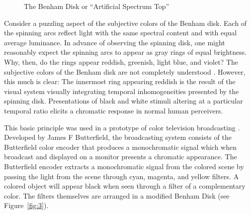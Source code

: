 \begin{figure}[ht]
    \begin{center}
    \end{center}
    \caption{The Benham Disk or ``Artificial Spectrum Top''}
    \label{fig:2}
\end{figure}

Consider a puzzling aspect of the subjective colors of the Benham disk. Each of the spinning arcs reflect light with the same spectral content and with equal average luminance. In advance of observing the spinning disk, one might reasonably expect the spinning arcs to appear as gray rings of equal brightness. Why, then, do the rings appear reddish, greenish, light blue, and violet? The subjective colors of the Benham disk are not completely understood \citep[for a review of some of the color science see][]{Campenhausen:1995yq}. However, this much is clear: The innermost ring appearing reddish is the result of the visual system visually integrating temporal inhomogeneities presented by the spinning disk. Presentations of black and white stimuli altering at a particular temporal ratio elicits a chromatic response in normal human perceivers. 

This basic principle was used in a prototype of color television broadcasting \citep[]{Griffin:1968fk}. Developed by James F Butterfield, the broadcasting system consists of the Butterfield color encoder that produces a monochromatic signal which when broadcast and displayed on a monitor presents a chromatic appearance. The Butterfield encoder extracts a monochromatic signal from the colored scene by passing the light from the scene through cyan, magenta, and yellow filters. A colored object will appear black when seen through a filter of a complementary color. The filters themselves are arranged in a modified Benham Disk (see Figure~\ref{fig:3}).

